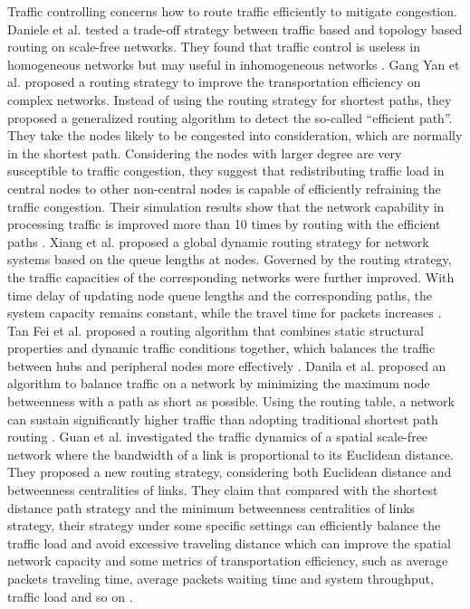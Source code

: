 \documentclass[onecolumn,preprintnumbers,amsmath,amssymb]{revtex4}
\begin{document}
Traffic controlling concerns how to route traffic efficiently to mitigate congestion.
Daniele et al. tested a trade-off strategy between traffic based and topology based routing on scale-free networks.
They found that traffic control is useless in homogeneous networks but may useful in inhomogeneous networks \cite{DDL}. 
Gang Yan et al. proposed a routing strategy to improve the transportation efficiency on complex networks. 
Instead of using the routing strategy for shortest paths, they proposed a generalized routing algorithm to detect the so-called ``efficient path''.
They take the nodes likely to be congested into consideration, which are normally in the shortest path.
Considering the nodes with larger degree are very susceptible to traffic congestion, they suggest that redistributing traffic load in central nodes to other non-central nodes is capable of efficiently refraining the traffic congestion.
Their simulation results show that the network capability in processing traffic is improved more than 10 times by routing with the efficient paths \cite{GYT}.
Xiang et al. proposed a global dynamic routing strategy for network systems based on the queue lengths at nodes. 
Governed by the routing strategy, the traffic capacities of the corresponding networks were further improved. 
With time delay of updating node queue lengths and the corresponding paths, the system capacity remains constant, while the travel time for packets increases \cite{XLM}.
Tan Fei et al. proposed a routing algorithm that combines static structural properties and dynamic traffic conditions together, which balances the traffic between hubs and peripheral nodes more effectively \cite{FTY}.
Danila et al. proposed an algorithm to balance traffic on a network by minimizing the maximum node betweenness with a path as short as possible. 
Using the routing table, a network can sustain significantly higher traffic than adopting traditional shortest path routing \cite{BDY}.
Guan et al. investigated the traffic dynamics of a spatial scale-free network where the bandwidth of a link is proportional to its Euclidean distance.
They proposed a new routing strategy, considering both Euclidean distance and betweenness centralities of links. 
They claim that compared with the shortest distance path strategy and the minimum betweenness centralities of links strategy, their strategy under some specific settings can efficiently balance the traffic load and avoid excessive traveling distance which can improve the spatial network capacity and some metrics of transportation efficiency, such as average packets traveling time, average packets waiting time and system throughput, traffic load and so on \cite{XLMD}.
\end{document}
